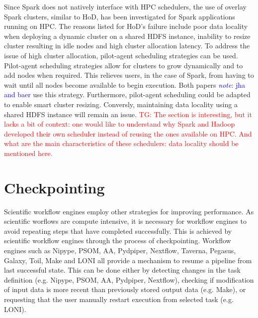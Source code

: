 \documentclass{report}
\newcommand{\note}[1]{\textcolor{blue}{\textit{note}: #1}}
\newcommand{\tristan}[1]{\textcolor{red}{TG: #1}}
\begin{document}
            Since Spark does not natively interface with HPC schedulers, 
            the use of overlay Spark clusters, similar to HoD, has been 
            investigated for Spark applications running on HPC. The reasons 
            listed for HoD's failure include poor 
            data locality when deploying a dynamic cluster on a shared HDFS 
            instance, inability to resize cluster resulting in idle nodes and 
            high cluster allocation latency. To address the issue of high 
            cluster allocation, pilot-agent scheduling strategies can be used.
            Pilot-agent scheduling strategies allow for clusters to grow 
            dynamically and to add nodes when required. This relieves users, 
            in the case of Spark, from having to wait until all nodes become 
            available to begin execution. Both papers \note{jha and baer} use 
            this strategy. Furthermore, pilot-agent scheduling could be adapted
            to enable smart cluster resizing. Conversly, maintaining data 
            locality using a shared HDFS instance will remain an issue. 
            \tristan{The section is interesting, but it lacks a bit of context: one would like to 
            understand why Spark and Hadoop developed their own scheduler instead of
            reusing the ones available on HPC. And what are the main characteristics of these
            schedulers: data locality should be mentioned here.}

        \section{Checkpointing}\label{other}                                    
                                                                                
            Scientific workflow engines employ other strategies for improving   
            performance. As scientific worflows are compute intensive, it is    
            necessary for workflow engines to avoid repeating steps that have   
            completed successfully. This is achieved by scientific workflow     
            engines through the process of checkpointing. Workflow engines such 
            as Nipype, PSOM, AA, Pydpiper, Nextflow, Taverna, Pegasus, Galaxy,  
            Toil, Make and LONI all provide a mechanism to resume a pipeline    
            from last successful state. This can be done either by detecting    
            changes in the task definition (e.g. Nipype, PSOM, AA, Pydpiper,    
            Nextflow), checking if modification of input                        
            data is more recent than previously stored output data (e.g. Make), 
            or requesting that the user manually restart execution from         
            selected task (e.g. LONI).                                          
                                                                                
\end{document}
